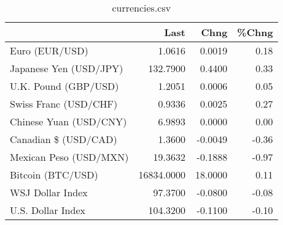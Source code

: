 \documentclass{article}%
\begin{document}
%


\begin{table}[htbp]%
\caption{currencies.csv}%
\centering%
\begin{adjustbox}{width=1\textwidth}%
\begin{tabular}{lrrr}
\toprule
                       &       Last &    Chng &  \%Chng \\
\midrule
        Euro (EUR/USD) &     1.0616 &  0.0019 &   0.18 \\
Japanese Yen (USD/JPY) &   132.7900 &  0.4400 &   0.33 \\
  U.K. Pound (GBP/USD) &     1.2051 &  0.0006 &   0.05 \\
 Swiss Franc (USD/CHF) &     0.9336 &  0.0025 &   0.27 \\
Chinese Yuan (USD/CNY) &     6.9893 &  0.0000 &   0.00 \\
  Canadian \$ (USD/CAD) &     1.3600 & -0.0049 &  -0.36 \\
Mexican Peso (USD/MXN) &    19.3632 & -0.1888 &  -0.97 \\
     Bitcoin (BTC/USD) & 16834.0000 & 18.0000 &   0.11 \\
      WSJ Dollar Index &    97.3700 & -0.0800 &  -0.08 \\
     U.S. Dollar Index &   104.3200 & -0.1100 &  -0.10 \\
\bottomrule
\end{tabular}
%
\end{adjustbox}%
\end{table}

%
\end{document}
